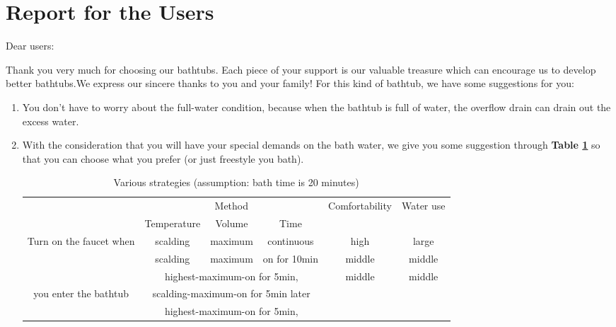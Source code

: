 \documentclass{HZNUMCM}
\begin{document}
\clearpage
{\renewcommand{\baselinestretch}{1.3}\normalsize
\section*{Report for the Users}
\begin{flushleft}
Dear users:
\end{flushleft}

Thank you very much for choosing our bathtubs. Each piece of your support is our valuable treasure
which can encourage us to develop better bathtubs.We express our sincere thanks to you and your
family!
For this kind of bathtub, we have some suggestions for you:
\begin{enumerate}[\bf 1.]
    \item You don't have to worry about the full-water condition, because when the bathtub is full
    of water, the overflow drain can drain out the excess water.
    \item With the consideration that you will have your special demands on the bath water, we give
    you some suggestion through \textbf{Table \ref{advices}} so that you can choose what you prefer
    (or just freestyle you bath).
    \begin{table}[!htbp]
    \centering
    \footnotesize
    \caption{Various strategies (assumption: bath time is 20 minutes)}
    \label{advices}
        \begin{tabular}{c|ccc|c|c}
        \toprule
        \multirow{2}{*}{} & \multicolumn{3}{c|}{Method}
         & \multirow{2}{*}{Comfortability} & \multirow{2}{*}{Water use}\\
        \cline{2-4} & \multicolumn{1}{c|}{Temperature} & \multicolumn{1}{c|}{Volume}
        & Time & {} & {}\\
        \midrule
        \multirow{3}{*}{Turn on the faucet when} & \multicolumn{1}{c|}{scalding}
         & \multicolumn{1}{c|}{maximum} & continuous & high & large\\
        \cline{2-6} & \multicolumn{1}{c|}{scalding} & \multicolumn{1}{c|}{maximum}
         & on for 10min & middle & middle\\
        \cline{2-6} & \multicolumn{3}{c|}{highest-maximum-on for 5min,}
         & \multirow{2}{*}{middle} & \multirow{2}{*}{middle}\\
        \multirow{3}{*}{you enter the bathtub}
         & \multicolumn{3}{c|}{scalding-maximum-on for 5min later}{} & {} & \\
        \cline{2-6} & \multicolumn{3}{c|}{highest-maximum-on for 5min,}

\end{tabular}
\end{table}
\end{enumerate}}
\end{document}
